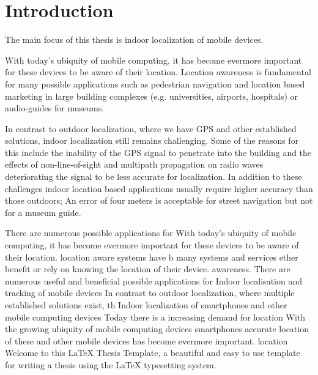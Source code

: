 
\chapter{Introduction} %

\label{Chapter1} %


\newcommand{\keyword}[1]{\textbf{#1}}
\newcommand{\tabhead}[1]{\textbf{#1}}
\newcommand{\code}[1]{\texttt{#1}}
\newcommand{\file}[1]{\texttt{\bfseries#1}}
\newcommand{\option}[1]{\texttt{\itshape#1}}


The main focus of this thesis is indoor localization of mobile devices.

With today's ubiquity of mobile computing, it has become evermore important for these devices to be aware of their location. Location awareness is fundamental for many possible applications such as pedestrian navigation and location based marketing in large building complexes (e.g. universities, airports, hospitals) or audio-guides for museums.

In contrast to outdoor localization, where we have GPS and other established solutions, indoor localization still remains challenging. Some of the reasons for this include the inability of the GPS signal to penetrate into the building and the effects of non-line-of-sight and multipath propagation on radio waves deteriorating the signal to be less accurate for localization\cite{JoseMaster,multipathEffects}. In addition to these challenges indoor location based applications usually require higher accuracy than those outdoors; An error of four meters is acceptable for street navigation but not for a museum guide.



There are numerous possible applications for
With today's ubiquity of mobile computing, it has become evermore important for these devices to be aware of their location. location aware systems have b many systems and services ether benefit or rely on knowing the location of their device. awareness.
There are numerous useful and beneficial possible applications for Indoor localisation and tracking of mobile devices  
In contrast to outdoor localization, where multiple established solutions exist, th
Indoor localization of smartphones and other mobile computing devices
Today there is a increasing demand for location 
With the growing ubiquity of mobile computing devices  smartphones accurate location of these and other mobile devices has become evermore important.  location Welcome to this \LaTeX{} Thesis Template, a beautiful and easy to use template for writing a thesis using the \LaTeX{} typesetting system.

